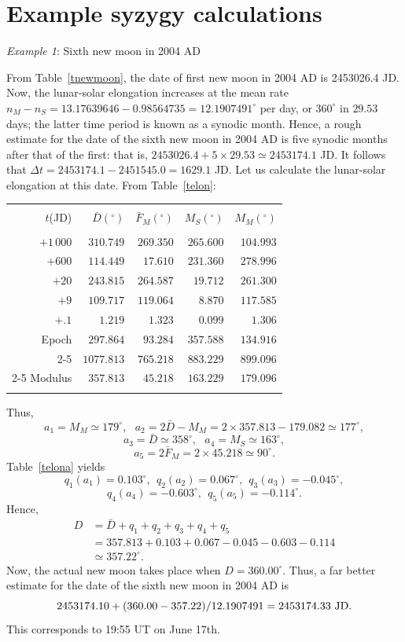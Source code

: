 \section{Example syzygy calculations}
\begin{center}
{\em Example 1}: Sixth new moon in 2004 AD
\end{center}
From Table~\ref{tnewmoon}, the date of first new moon in 2004 AD is 2453026.4 JD. Now, the
lunar-solar elongation increases at the mean rate $n_M - n_S = 13.17639646-0.98564735=12.1907491^\circ$ per day, or
$360^\circ$ in $29.53$ days; the latter  time period is known as a synodic month. Hence, a rough estimate for the
date of the sixth new moon in 2004 AD is five synodic months after that of the first: that is, $2453026.4
+ 5\times 29.53\simeq 2453174.1$ JD. It follows that $\Delta t = 2453174.1-2451545.0=1629.1$ JD. Let us calculate the lunar-solar elongation at this date.
From Table~\ref{telon}:
\begin{center}
\begin{tabular}{rrrrr}
&&&&\\
$t$(JD) & $ \bar{D}(^\circ)$ & $\bar{F}_M(^\circ)$ & $M_S(^\circ)$ & $M_M(^\circ)$\\[-2ex]
&&&&\\
$+1\,000$ & $310.749$ & $269.350$ & $265.600$ & $104.993$\\
$+600$ & $114.449$ & $17.610$ & $231.360$ & $278.996$\\
$+20$ & $243.815$ & $264.587$ & $19.712$ & $261.300$\\
$+9$ & $109.717$ & $119.064$ & $8.870$ & $117.585$\\
$+.1$ & $1.219$ & $1.323$ & $0.099$ & $1.306$\\
Epoch & $297.864$ & $93.284$ & $357.588$ & $134.916$\\\cline{2-5}
&$1077.813$ & $765.218$ & $883.229$ & $899.096$\\\cline{2-5}
Modulus & $357.813$ & $45.218$ &$163.229$ & $179.096$\\ 
&&&\\
\end{tabular}
\end{center}
Thus,
$$
a_1=M_M\simeq 179^\circ,~~~a_2=2\bar{D}-M_M = 2\times 357.813-179.082\simeq 177^\circ,
$$ 
$$
a_3=\bar{D}\simeq 358^\circ,~~~a_4 = M_S\simeq 163^\circ,
$$ 
$$
a_5=2\bar{F}_M = 2\times 45.218\simeq 90^\circ.
$$
Table~\ref{telona} yields $$
q_1(a_1)=0.103^\circ,~~q_2(a_2)= 0.067^\circ,~~q_3(a_3) = -0.045^\circ,
$$
$$q_4(a_4)=-0.603^\circ,~~q_5(a_5)= -0.114^\circ.
$$
 Hence,
\begin{align*}
D &= \bar{D} + q_1+q_2+q_3+q_4+q_5\\[0.5ex]
&=357.813+0.103+0.067-0.045-0.603-0.114\\[0.5ex]
&\simeq 357.22^\circ.
\end{align*}
Now, the actual new moon takes place when $D=360.00^\circ$. Thus, a far better estimate for the date 
of the sixth new moon in 2004 AD is $$2453174.10 +(360.00-357.22)/12.1907491= 2453174.33\,\,{\rm JD}.$$
This corresponds to 19:55 UT on June 17th.

